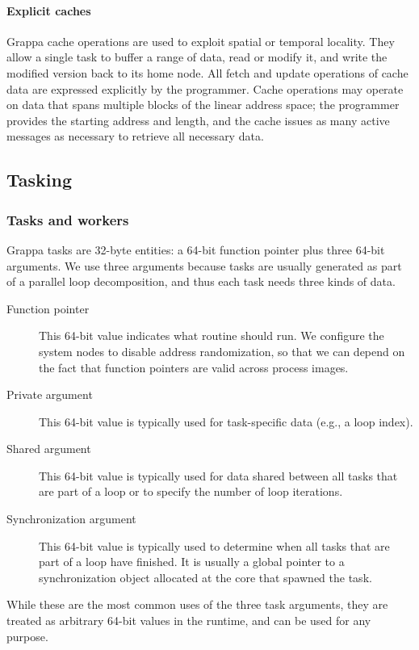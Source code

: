 \paragraph{Explicit caches} Grappa cache operations are used to exploit
spatial or temporal locality. They allow a single task to buffer a range of
data, read or modify it, and write the modified version back to its home node.
All fetch and update operations of cache data are expressed explicitly by the
programmer. Cache operations may operate on data that spans multiple blocks of
the linear address space; the programmer provides the starting address and
length, and the cache issues as many active messages as necessary to retrieve
all necessary data.



\subsection{Tasking}

\subsubsection{Tasks and workers}

Grappa tasks are 32-byte entities: a 64-bit function pointer plus
three 64-bit arguments. We use three arguments because tasks are
usually generated as part of a parallel loop decomposition, and thus
each task needs three kinds of data.
\begin{description}
\item[Function pointer] This 64-bit value indicates what routine
  should run. We configure the system nodes to disable address randomization, so that we can depend on the fact that function pointers are valid across process images.
\item[Private argument] This 64-bit value is typically used for task-specific
  data (e.g., a loop index).
\item[Shared argument] This 64-bit value is typically used for data shared
  between all tasks that are part of a loop or to specify the number
  of loop iterations.
\item[Synchronization argument] This 64-bit value is typically used to determine
  when all tasks that are part of a loop have finished. It is usually
  a global pointer to a synchronization object allocated at the core
  that spawned the task.
\end{description}
While these are the most common uses of the three task arguments, they
are treated as arbitrary 64-bit values in the runtime, and can be used
for any purpose.


